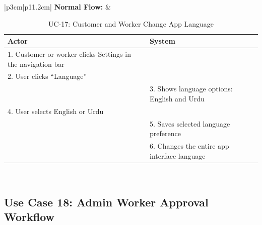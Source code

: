 {\small
\renewcommand{\arraystretch}{1.05}
\begin{table}[H]
\centering
\begin{tabular}{|p{3cm}|p{11.2cm}|}
\hline
\textbf{Normal Flow:} &
\begin{tabular}[t]{|p{5.4cm}|p{5.4cm}|}
\hline
\textbf{Actor} & \textbf{System} \\ \hline
1. Customer or worker clicks Settings in the navigation bar & \\ \hline
2. User clicks ``Language'' & \\ \hline
 & 3. Shows language options: English and Urdu \\ \hline
4. User selects English or Urdu & \\ \hline
 & 5. Saves selected language preference \\ \hline
 & 6. Changes the entire app interface language \\ \hline
\end{tabular} \\ \hline
\end{tabular}
\caption{UC-17: Customer and Worker Change App Language}
\end{table}
}

\newpage

\subsection*{Use Case 18: Admin Worker Approval Workflow}


